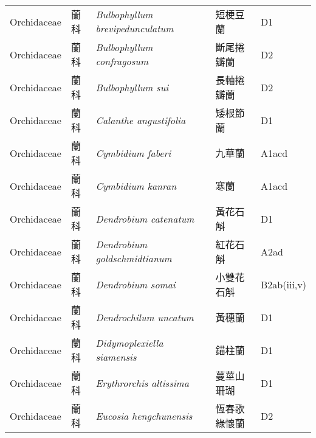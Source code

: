 {\begin{longtable}{p{2.5cm}p{2.5cm}p{4.5cm}p{2.5cm}p{3cm}}
    Orchidaceae & 蘭科 & \textit{Bulbophyllum brevipedunculatum}  & 短梗豆蘭 & D1 \index{Bulbophyllum@\textit{Bulbophyllum}!brevipedunculatum@\textit{brevipedunculatum}}  \index{短梗豆蘭} \\
    Orchidaceae & 蘭科 & \textit{Bulbophyllum confragosum}  & 斷尾捲瓣蘭 & D2 \index{Bulbophyllum@\textit{Bulbophyllum}!confragosum@\textit{confragosum}}  \index{斷尾捲瓣蘭} \\
    Orchidaceae & 蘭科 & \textit{Bulbophyllum sui}  & 長軸捲瓣蘭 & D2 \index{Bulbophyllum@\textit{Bulbophyllum}!sui@\textit{sui}}  \index{長軸捲瓣蘭} \\
    Orchidaceae & 蘭科 & \textit{Calanthe angustifolia}  & 矮根節蘭 & D1 \index{Calanthe@\textit{Calanthe}!angustifolia@\textit{angustifolia}}  \index{矮根節蘭} \\
    Orchidaceae & 蘭科 & \textit{Cymbidium faberi}  & 九華蘭 & A1acd \index{Cymbidium@\textit{Cymbidium}!faberi@\textit{faberi}}  \index{九華蘭} \\
    Orchidaceae & 蘭科 & \textit{Cymbidium kanran}  & 寒蘭 & A1acd \index{Cymbidium@\textit{Cymbidium}!kanran@\textit{kanran}}  \index{寒蘭} \\
    Orchidaceae & 蘭科 & \textit{Dendrobium catenatum}  & 黃花石斛 & D1 \index{Dendrobium@\textit{Dendrobium}!catenatum@\textit{catenatum}}  \index{黃花石斛} \\
    Orchidaceae & 蘭科 & \textit{Dendrobium goldschmidtianum}  & 紅花石斛 & A2ad \index{Dendrobium@\textit{Dendrobium}!goldschmidtianum@\textit{goldschmidtianum}}  \index{紅花石斛} \\
    Orchidaceae & 蘭科 & \textit{Dendrobium somai}  & 小雙花石斛 & B2ab(iii,v) \index{Dendrobium@\textit{Dendrobium}!somai@\textit{somai}}  \index{小雙花石斛} \\
    Orchidaceae & 蘭科 & \textit{Dendrochilum uncatum}  & 黃穗蘭 & D1 \index{Dendrochilum@\textit{Dendrochilum}!uncatum@\textit{uncatum}}  \index{黃穗蘭} \\
    Orchidaceae & 蘭科 & \textit{Didymoplexiella siamensis}  & 錨柱蘭 & D1 \index{Didymoplexiella@\textit{Didymoplexiella}!siamensis@\textit{siamensis}}  \index{錨柱蘭} \\
    Orchidaceae & 蘭科 & \textit{Erythrorchis altissima}  & 蔓莖山珊瑚 & D1 \index{Erythrorchis@\textit{Erythrorchis}!altissima@\textit{altissima}}  \index{蔓莖山珊瑚} \\
    Orchidaceae & 蘭科 & \textit{Eucosia hengchunensis}  & 恆春歌綠懷蘭 & D2 \index{Eucosia@\textit{Eucosia}!hengchunensis@\textit{hengchunensis}}  \index{恆春歌綠懷蘭} \\

\end{longtable}}

